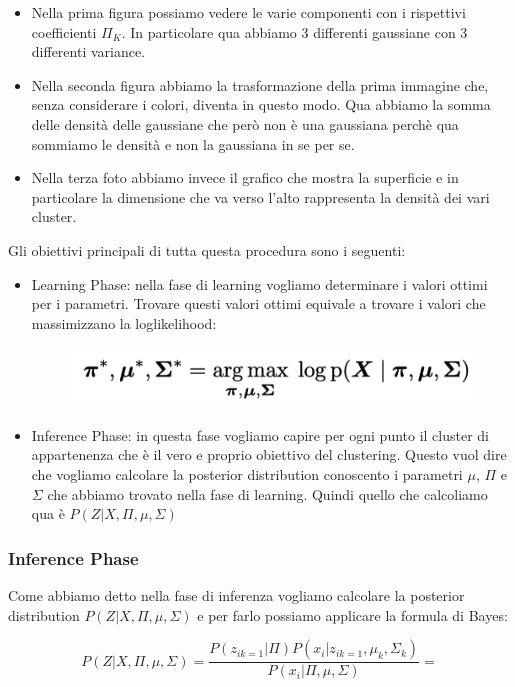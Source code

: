 \documentclass[14pt]{extreport}
\begin{document}
\begin{itemize}
\item Nella prima figura possiamo vedere le varie componenti con i rispettivi coefficienti $\Pi_K$. In particolare qua abbiamo 
3 differenti gaussiane con 3 differenti variance.
\item Nella seconda figura abbiamo la trasformazione della prima immagine che, senza considerare i colori, diventa in questo modo.
Qua abbiamo la somma delle densità delle gaussiane che però non è una 
gaussiana perchè qua sommiamo le densità e non la gaussiana in se per se.
\item Nella terza foto abbiamo invece il grafico che mostra la superficie e in particolare la dimensione che va verso l'alto rappresenta la densità dei vari cluster.
\end{itemize}

Gli obiettivi principali di tutta questa procedura sono i seguenti:
\begin{itemize}
\item Learning Phase: nella fase di learning vogliamo determinare i valori ottimi per i parametri. Trovare questi valori ottimi equivale a trovare i valori che 
massimizzano la loglikelihood:

\begin{figure}[H] 
\centering
\includegraphics[width=0.7\linewidth]{545.jpeg}
\end{figure}
\item Inference Phase: in questa fase vogliamo capire per ogni punto il cluster di appartenenza che è il vero e proprio obiettivo del clustering. 
Questo vuol dire che vogliamo calcolare la posterior distribution conoscento i parametri $\mu$, $\Pi$ e $\Sigma$ che abbiamo trovato nella fase di learning.
Quindi quello che calcoliamo qua è $P(Z|X,\Pi, \mu, \Sigma)$
\end{itemize}

\subsubsection{Inference Phase}

Come abbiamo detto nella fase di inferenza vogliamo calcolare la posterior distribution $P(Z|X,\Pi, \mu, \Sigma)$ e per farlo possiamo applicare la 
formula di Bayes:

$$P(Z|X,\Pi, \mu, \Sigma) = \frac{P(z_{ik=1}|\Pi)P(x_i|z_{ik=1},\mu_k,\Sigma_k)}{P(x_i|\Pi,\mu, \Sigma)} = $$
\end{document}
